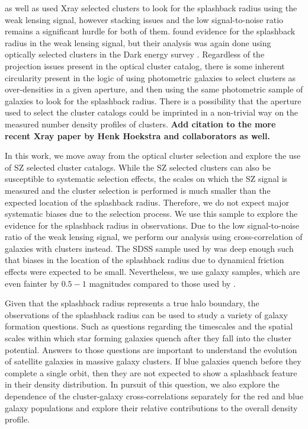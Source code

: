 \documentclass[iop, apjl, twocolappendix, numberedappendix]{emulateapj}
\begin{document}
\citet{umetsu2017lensing} as well as \citet{contigiani2018weak} 
used Xray selected clusters to look for the splashback radius 
using the weak lensing signal, however
stacking issues and the low signal-to-noise ratio remains a significant
hurdle for both of them. \citet{chang2017splashback} found evidence for the splashback
radius in the weak lensing signal, but their analysis was again done
using optically selected clusters in the Dark energy survey
\citep{dark2005dark}. Regardless of the projection issues present in
the optical cluster catalog, there is some inherent circularity
present in the logic of using photometric galaxies to select
clusters as over-densities in a given aperture, and then using the
same photometric sample of galaxies to look for the splashback
radius. There is a possibility that the aperture used to select the
cluster catalogs could be imprinted in a non-trivial way on the measured number
density profiles of clusters. {\bf Add citation to the more recent Xray paper
by Henk Hoekstra and collaborators as well.}

In this work, we move away from the optical cluster selection and
explore the use of SZ selected cluster catalogs. While the SZ
selected clusters can also be susceptible to systematic selection
effects, the scales on which the SZ signal is measured and the
cluster selection is performed is much smaller than the expected
location of the splashback radius. Therefore, we do not expect major
systematic biases due to the selection process. We use this sample
to explore the evidence for the splashback radius in observations.
Due to the low signal-to-noise ratio of the weak lensing signal, we
perform our analysis using cross-correlation of galaxies with
clusters instead. The SDSS sample used by \citet{more2016detection}
was deep enough such that biases in the location of the splashback
radius due to dynamical friction effects were expected to be small.
Nevertheless, we use galaxy samples, which are even fainter by
$0.5-1$ magnitudes compared to those used by
\citet{more2016detection}.

Given that the splashback radius represents a true halo boundary,
the observations of the splashback radius can be used to study a
variety of galaxy formation questions. Such as questions 
regarding the timescales and the spatial scales within
which star forming galaxies quench after they fall into the cluster
potential. Answers to those questions are important to understand 
the evolution of satellite galaxies in massive galaxy clusters. 
If blue galaxies quench before
they complete a single orbit, then they are not expected to show a
splashback feature in their density distribution. In pursuit of this
question, we also explore the dependence of the cluster-galaxy
cross-correlations separately for the red and blue galaxy populations 
and explore their relative contributions to the overall density profile.
\end{document}
